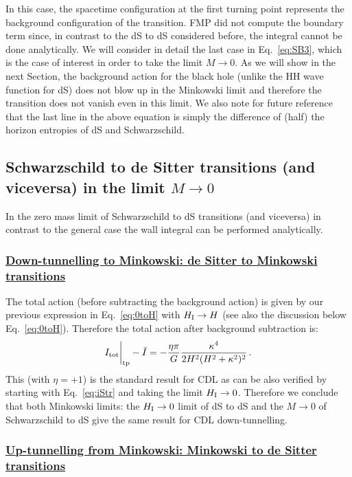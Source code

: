 \documentclass[11pt,a4paper]{article}
\begin{document}
In this case, the spacetime configuration at the first turning point represents the background configuration of the transition. FMP did not compute the boundary term since, in contrast to the dS to dS considered before, the integral cannot be done analytically. We will consider in detail the last case in Eq.~\eqref{eq:SB3}, which is the case of interest in order to take the limit $M \rightarrow 0$. As we will show in the next Section, the background action for the black hole (unlike the HH wave function for dS) does not blow up in the Minkowski limit and therefore the transition does not vanish even in this limit. We also note for future reference that the last line in the above equation is simply the difference of (half) the horizon entropies of dS and Schwarzschild.

\subsection{Schwarzschild to de Sitter transitions (and viceversa) in the limit $M \rightarrow 0$}

In the zero mass limit of Schwarzschild to dS transitions (and viceversa) in contrast to the general case the wall integral can be performed analytically. 

\subsubsection*{\underline{Down-tunnelling to Minkowski: de Sitter to Minkowski transitions}}
The total action (before subtracting the background action) is given by our previous expression in Eq.~\eqref{eq:0toH} with $H_{\rm I}\rightarrow H$ (see also the discussion below Eq.~\eqref{eq:0toH}). Therefore the total action after background subtraction is:
\begin{equation}
I_{\rm tot} \bigg|_{\rm tp}-\bar I = - \frac{\eta\pi}{G} \frac{\kappa^{4}}{2H^{2}(H^{2}+\kappa^{2})^{2}}  \,.
\label{eq:13} 
\end{equation} 
This (with $\eta=+1$) is the standard result for CDL as can be also verified by starting with Eq.~\eqref{eq:iStr} and taking the limit $H_{\rm I} \rightarrow 0$. Therefore we conclude that both Minkowski limits: the $H_{\rm I} \rightarrow 0$ limit of dS to dS and the $M \rightarrow 0$ of Schwarzschild to dS give the same result for CDL down-tunnelling.

\subsubsection*{\underline{Up-tunnelling from Minkowski: Minkowski to de Sitter transitions}} 
\end{document}
